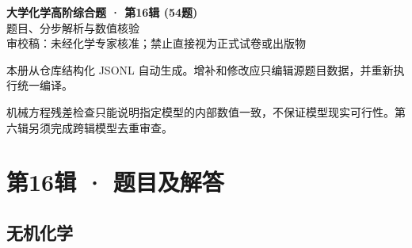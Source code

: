 \documentclass[UTF8,11pt,a4paper]{ctexart}
\begin{document}
\begin{center}
{\LARGE\bfseries 大学化学高阶综合题 · 第16辑 (54题)}\\[0.8em]
{\large 题目、分步解析与数值核验}\\[0.5em]
{\small \textcolor{red!65!black}{审校稿：未经化学专家核准；禁止直接视为正式试卷或出版物}}
\end{center}
\vspace{1em}
\noindent 本册从仓库结构化 JSONL 自动生成。增补和修改应只编辑源题目数据，并重新执行统一编译。
\par 机械方程残差检查只能说明指定模型的内部数值一致，不保证模型现实可行性。第六辑另须完成跨辑模型去重审查。
\tableofcontents
\clearpage
\section*{第16辑 · 题目及解答}
\subsection*{无机化学}
\end{document}
